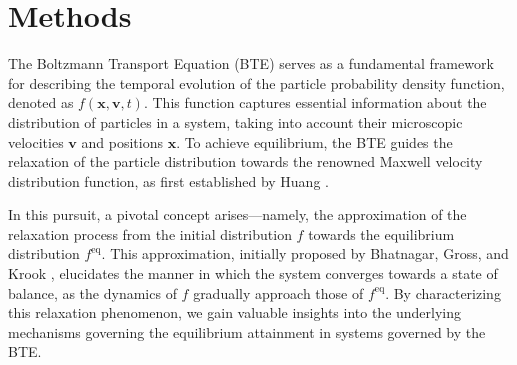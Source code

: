 \chapter{Methods}

The Boltzmann Transport Equation (BTE) serves as a fundamental framework for describing the temporal evolution of the particle probability density function, denoted as \(f(\mathbf{x}, \mathbf{v}, t)\).
This function captures essential information about the distribution of particles in a system, taking into account their microscopic velocities \(\mathbf{v}\) and positions \(\mathbf{x}\).
To achieve equilibrium, the BTE guides the relaxation of the particle distribution towards the renowned Maxwell velocity distribution function, as first established by Huang \cite{huang1963statistical}.
\newline

In this pursuit, a pivotal concept arises—namely, the approximation of the relaxation process from the initial distribution \(f\) towards the equilibrium distribution \(f^{\mathrm{eq}}\).
This approximation, initially proposed by Bhatnagar, Gross, and Krook \cite{bhatnagar1954model}, elucidates the manner in which the system converges towards a state of balance, as the dynamics of \(f\) gradually approach those of \(f^{\mathrm{eq}}\).
By characterizing this relaxation phenomenon, we gain valuable insights into the underlying mechanisms governing the equilibrium attainment in systems governed by the BTE.